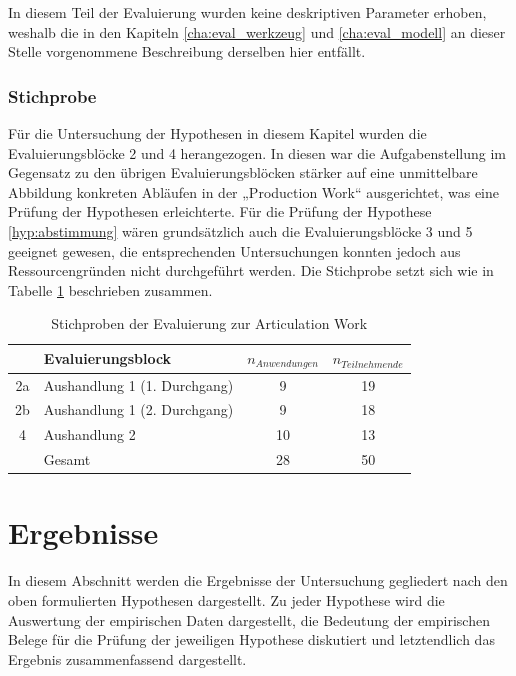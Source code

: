 In diesem Teil der Evaluierung wurden keine deskriptiven Parameter erhoben, weshalb die in den Kapiteln \ref{cha:eval_werkzeug} und \ref{cha:eval_modell} an dieser Stelle vorgenommene Beschreibung derselben hier entfällt.

\subsubsection{Stichprobe} %

Für die Untersuchung der Hypothesen in diesem Kapitel wurden die Evaluierungsblöcke 2 und 4 herangezogen.  In diesen war die Aufgabenstellung im Gegensatz zu den übrigen Evaluierungsblöcken stärker auf eine unmittelbare Abbildung konkreten Abläufen in der „Production Work“ ausgerichtet, was eine Prüfung der Hypothesen erleichterte. Für die Prüfung der Hypothese \ref{hyp:abstimmung} wären grundsätzlich auch die Evaluierungsblöcke 3 und 5 geeignet gewesen, die entsprechenden Untersuchungen konnten jedoch aus Ressourcengründen nicht durchgeführt werden. Die Stichprobe setzt sich wie in Tabelle \ref{tab:stichprobe_aw} beschrieben zusammen.

\begin{table}[htbp]
	\centering
	\caption{Stichproben der Evaluierung zur Articulation Work}

		\begin{tabular}{| c | l || c | c |}
		\hline
			& Evaluierungsblock & $n_{Anwendungen}$ & $n_{Teilnehmende}$ \\ \hline
			2a & Aushandlung 1 (1. Durchgang)  &  9 & 19 \\
			2b & Aushandlung 1 (2. Durchgang)  &  9 & 18 \\
			4 & Aushandlung 2				  & 10 & 13 \\ \hline
			& Gesamt						  & 28 & 50 \\ \hline
	\end{tabular}
	\label{tab:stichprobe_aw}
\end{table}


\section{Ergebnisse} %
\label{sec:a_ergebnisse}

In diesem Abschnitt werden die Ergebnisse der Untersuchung gegliedert nach den oben formulierten Hypothesen dargestellt. Zu jeder Hypothese wird die Auswertung der empirischen Daten dargestellt, die Bedeutung der empirischen Belege für die Prüfung der jeweiligen Hypothese diskutiert und letztendlich das Ergebnis zusammenfassend dargestellt.  

